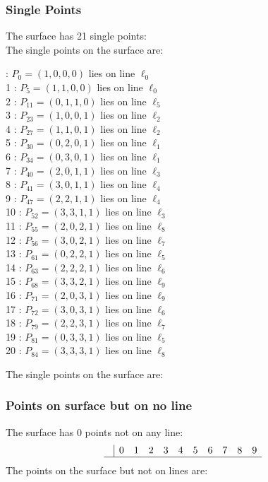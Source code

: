 \documentclass{article}
\begin{document}
{\subsubsection*{Single Points}
The surface has 21 single points:\\
The single points on the surface are:\\
\begin{multicols}{2}
 : $P_{0}=( 1, 0, 0, 0 )$ lies on line $\ell_{0}$\\
1 : $P_{5}=( 1, 1, 0, 0 )$ lies on line $\ell_{0}$\\
2 : $P_{11}=( 0, 1, 1, 0 )$ lies on line $\ell_{5}$\\
3 : $P_{23}=( 1, 0, 0, 1 )$ lies on line $\ell_{2}$\\
4 : $P_{27}=( 1, 1, 0, 1 )$ lies on line $\ell_{2}$\\
5 : $P_{30}=( 0, 2, 0, 1 )$ lies on line $\ell_{1}$\\
6 : $P_{34}=( 0, 3, 0, 1 )$ lies on line $\ell_{1}$\\
7 : $P_{40}=( 2, 0, 1, 1 )$ lies on line $\ell_{3}$\\
8 : $P_{41}=( 3, 0, 1, 1 )$ lies on line $\ell_{4}$\\
9 : $P_{47}=( 2, 2, 1, 1 )$ lies on line $\ell_{4}$\\
10 : $P_{52}=( 3, 3, 1, 1 )$ lies on line $\ell_{3}$\\
11 : $P_{55}=( 2, 0, 2, 1 )$ lies on line $\ell_{8}$\\
12 : $P_{56}=( 3, 0, 2, 1 )$ lies on line $\ell_{7}$\\
13 : $P_{61}=( 0, 2, 2, 1 )$ lies on line $\ell_{5}$\\
14 : $P_{63}=( 2, 2, 2, 1 )$ lies on line $\ell_{6}$\\
15 : $P_{68}=( 3, 3, 2, 1 )$ lies on line $\ell_{9}$\\
16 : $P_{71}=( 2, 0, 3, 1 )$ lies on line $\ell_{9}$\\
17 : $P_{72}=( 3, 0, 3, 1 )$ lies on line $\ell_{6}$\\
18 : $P_{79}=( 2, 2, 3, 1 )$ lies on line $\ell_{7}$\\
19 : $P_{81}=( 0, 3, 3, 1 )$ lies on line $\ell_{5}$\\
20 : $P_{84}=( 3, 3, 3, 1 )$ lies on line $\ell_{8}$\\
\end{multicols}
The single points on the surface are:\\
\subsubsection*{Points on surface but on no line}
The surface has 0 points not on any line:\\
$$
\begin{array}{r|*{10}{r}}
 & 0 & 1 & 2 & 3 & 4 & 5 & 6 & 7 & 8 & 9\\
\hline
\end{array}
$$
The points on the surface but not on lines are:\\
\begin{multicols}{2}
\noindent
\end{multicols}
}
\end{document}
